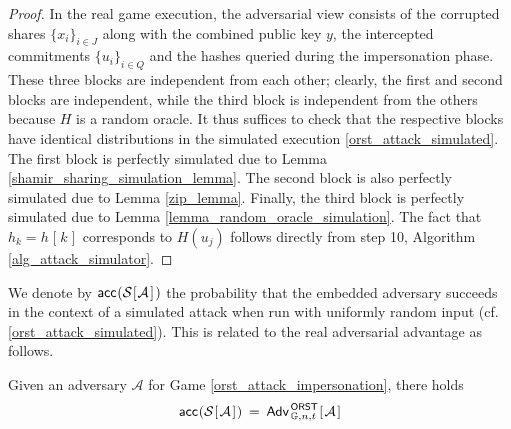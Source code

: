 \documentclass{iacrtrans}
\begin{document}
\begin{proof}
In the real game execution, the adversarial view consists of
the corrupted shares $\{x_i\}_{i \in J}$
along with the combined public key $y$,
the intercepted commitments $\{u_i\}_{i \in Q}$
and the hashes queried during the impersonation phase.
These three blocks are independent
from each other; clearly, the first and second blocks are
independent, while the third block is independent from the others
because $H$ is a random oracle.
It thus suffices to check that the respective blocks
have identical distributions in the simulated execution
\eqref{orst_attack_simulated}.
The first block is perfectly simulated
due to Lemma \ref{shamir_sharing_simulation_lemma}.
The second block is also perfectly simulated
due to Lemma \ref{zip_lemma}.
Finally, the third block is perfectly simulated
due to Lemma \ref{lemma_random_oracle_simulation}.
The fact that
$h_k = h\hspace{1pt}[\hspace{1pt}k\hspace{1pt}]$
corresponds to $H(u_j)$
follows directly from step 10, Algorithm \ref{alg_attack_simulator}.
\vspace{5pt}
\end{proof}

\noindent
We denote by
$
\mathsf{acc}\hspace{0.5pt}(
	\mathcal{S}
	\hspace{0.5pt}
	[
		\hspace{0.5pt}
		\mathcal{A}
		\hspace{1pt}
	]
	\hspace{1pt})
$
the probability that the embedded adversary
succeeds in the context of a simulated attack
when run with uniformly random input
(cf. \eqref{orst_attack_simulated}).
This is related to the real adversarial advantage
as follows.

\begin{cor}\label{equality_intermediate}
Given an adversary $\mathcal{A}$
for Game \textup{\ref{orst_attack_impersonation}},
there holds
\vspace{5pt}
\begin{equation}
	\mathsf{acc}\hspace{0.5pt}(
		\mathcal{S}
		\hspace{0.5pt}[
			\hspace{1pt}
			\mathcal{A}
			\hspace{1pt}
		]\hspace{0.5pt}
	)
	\hspace{2pt}
	=
	\hspace{2pt}
	\mathsf{Adv}
		_{\hspace{1pt}\mathbb{G}, n, t}
		^{\hspace{1pt}\mathsf{ORST}}\hspace{0.5pt}
		[
			\hspace{1pt}
			\mathcal{A}
			\hspace{1pt}
		]
\vspace{5pt}
\end{equation}
\end{cor}
\end{document}
